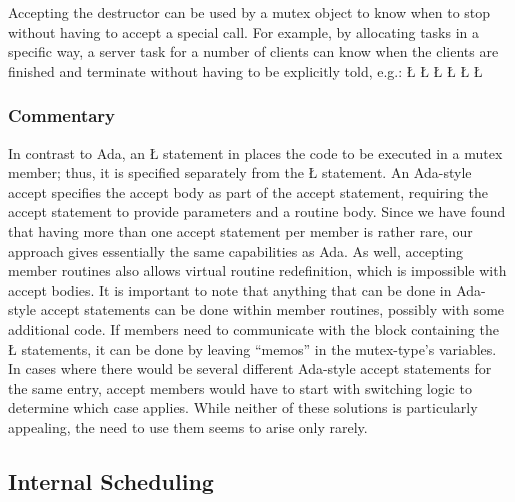 \documentclass[openright,twoside]{report}
\begin{document}
Accepting the destructor can be used by a mutex object to know when to stop without having to accept a special call.
For example, by allocating tasks in a specific way, a server task for a number of clients can know when the clients are finished and terminate without having to be explicitly told, e.g.:
\LGinlinefalse\LGbegin\lgrinde
\L{\LB{\{}}
\L{\LB{}}
\CE{}\L{\LB{}}
\L{\LB{}}
\CE{}\L{\LB{}}
\CE{}\L{}
\CE{}\endlgrinde\LGend


\subsubsection{Commentary}

In contrast to Ada, an \LGinlinetrue\LGbegin\lgrinde\L{}\endlgrinde\LGend{} statement in \uC places the code to be executed in a mutex member;
thus, it is specified separately from the \LGinlinetrue\LGbegin\lgrinde\L{}\endlgrinde\LGend{} statement.
An Ada-style accept specifies the accept body as part of the accept statement, requiring the accept statement to provide parameters and a routine body.
Since we have found that having more than one accept statement per member is rather rare, our approach gives essentially the same capabilities as Ada.
As well, accepting member routines also allows virtual routine redefinition, which is impossible with accept bodies.
It is important to note that anything that can be done in Ada-style accept statements can be done within member routines, possibly with some additional code.
If members need to communicate with the block containing the \LGinlinetrue\LGbegin\lgrinde\L{}\endlgrinde\LGend{} statements, it can be done by leaving ``memos'' in the mutex-type's variables.
In cases where there would be several different Ada-style accept statements for the same entry, accept members would have to start with switching logic to determine which case applies.
While neither of these solutions is particularly appealing, the need to use them seems to arise only rarely.


\subsection{Internal Scheduling}
\label{s:InternalScheduling}
\end{document}
